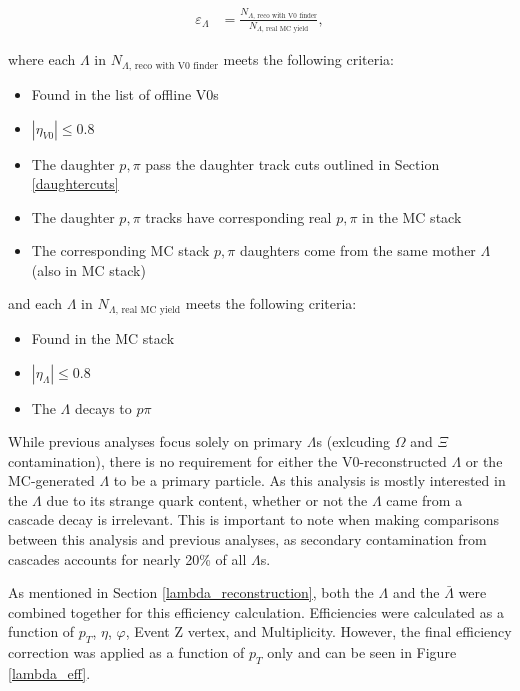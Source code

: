 \documentclass[ALICE,manyauthors]{ALICE_analysis_notes}
\begin{document}
\begin{align*}
	\varepsilon_{\Lambda} &=  \frac{N_{\Lambda\text{, reco with V0 finder}}}{N_{\Lambda\text{, real MC yield}}},
\end{align*}

where each $\Lambda$ in $N_{\Lambda\text{, reco with V0 finder}}$ meets the following criteria:

\begin{itemize}
	\item Found in the list of offline V0s
	\item $|\eta_{V0}| \leq 0.8$
	\item The daughter $p, \pi$ pass the daughter track cuts outlined in Section \ref{daughtercuts}
	\item The daughter $p, \pi$ tracks have corresponding real $p, \pi$ in the MC stack
	\item The corresponding MC stack $p, \pi$ daughters come from the same mother $\Lambda$ (also in MC stack)
\end{itemize}

and each $\Lambda$ in $N_{\Lambda\text{, real MC yield}}$ meets the following criteria:

\begin{itemize}
	\item Found in the MC stack
	\item $|\eta_{\Lambda}| \leq 0.8$
	\item The $\Lambda$ decays to $p\pi$
\end{itemize}

While previous analyses focus solely on primary $\Lambda$s (exlcuding $\Omega$ and $\Xi$ contamination), there is no requirement for either the V0-reconstructed $\Lambda$ or the MC-generated $\Lambda$ to be a primary particle. As this analysis is mostly interested in the $\Lambda$ due to its strange quark content, whether or not the $\Lambda$ came from a cascade decay is irrelevant. This is important to note when making comparisons between this analysis and previous analyses, as secondary contamination from cascades accounts for nearly 20\% of all $\Lambda$s.

As mentioned in Section \ref{lambda_reconstruction}, both the $\Lambda$ and the $\bar{\Lambda}$ were combined together for this efficiency calculation. Efficiencies were calculated as a function of $p_T$, $\eta$, $\varphi$, Event Z vertex, and Multiplicity. However, the final efficiency correction was applied as a function of $p_T$ only and can be seen in Figure \ref{lambda_eff}.
\end{document}
